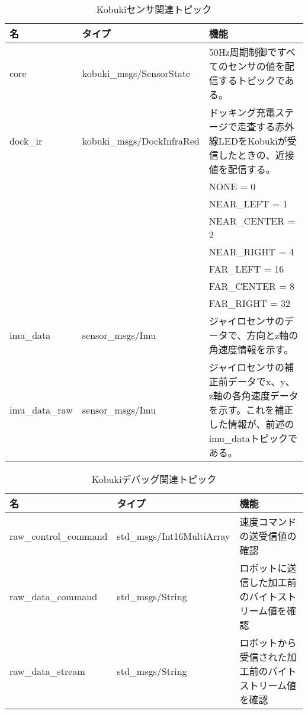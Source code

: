 \begin{table}[htp]
\centering
\begin{tabular}{p{2cm} p{5cm} p{6cm}}
\toprule
\textbf{名} & \textbf{タイプ} & \textbf{機能}\\
\midrule
core  & kobuki\_msgs/SensorState  & 50Hz周期制御ですべてのセンサの値を配信するトピックである。 \\
dock\_ir  & kobuki\_msgs/DockInfraRed  & ドッキング充電ステージで走査する赤外線LEDをKobukiが受信したときの、近接値を配信する。\\
& & NONE = 0 \\
& & NEAR\_LEFT = 1 \\
& & NEAR\_CENTER = 2 \\
& & NEAR\_RIGHT = 4 \\
& & FAR\_LEFT = 16 \\
& & FAR\_CENTER = 8 \\
& & FAR\_RIGHT = 32 \\
imu\_data  & sensor\_msgs/Imu  & ジャイロセンサのデータで、方向とz軸の角速度情報を示す。\\
imu\_data\_raw & sensor\_msgs/Imu  & ジャイロセンサの補正前データでx、y、z軸の各角速度データを示す。これを補正した情報が、前述のimu\_dataトピックである。\\
\bottomrule
\end{tabular}
\caption{Kobukiセンサ関連トピック}
\end{table}

\begin{table}[htp]
\centering
\begin{tabular}{p{4cm} p{4cm} p{5cm}}
\toprule
\textbf{名} & \textbf{タイプ} & \textbf{機能}\\
\midrule
raw\_control\_command & std\_msgs/Int16MultiArray & 速度コマンドの送受信値の確認 \\
raw\_data\_command  & std\_msgs/String & ロボットに送信した加工前のバイトストリーム値を確認 \\
raw\_data\_stream & std\_msgs/String & ロボットから受信された加工前のバイトストリーム値を確認 \\
\bottomrule
\end{tabular}
\caption{Kobukiデバッグ関連トピック}
\end{table}


